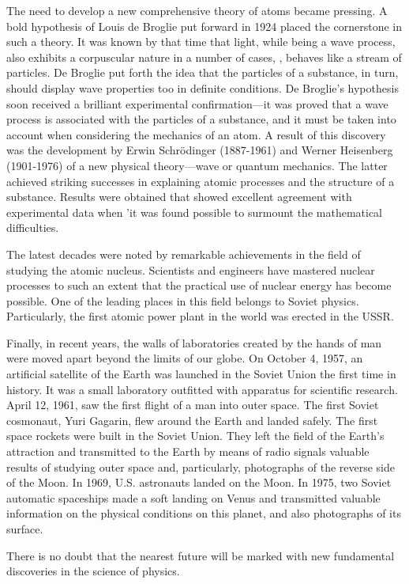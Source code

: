 The need to develop a new comprehensive theory of atoms became pressing. A bold hypothesis of Louis de Broglie put forward in 1924 placed the cornerstone in such a theory. It was known by that time that light, while being a wave process, also exhibits a corpuscular nature in a number of cases, \ie, behaves like a stream of particles. De Broglie put forth the idea that the particles of a substance, in turn, should display wave properties too in definite conditions. De Broglie's hypothesis soon received a brilliant experimental confirmation---it was proved that a wave process is associated with the particles of a substance, and it must be taken into account when considering the mechanics of an atom. A result of this discovery was the development by Erwin Schr\"odinger (1887-1961) and Werner Heisenberg (1901-1976) of a new physical theory---wave or quantum mechanics. The latter achieved striking successes in explaining atomic processes and the structure of a substance. Results were obtained that showed excellent agreement with experimental data when 'it was found possible to surmount the mathematical difficulties.

The latest decades were noted by remarkable achievements in the field of studying the atomic nucleus. Scientists and engineers have mastered nuclear processes to such an extent that the practical use of nuclear energy has become possible. One of the leading places in this field belongs to Soviet physics. Particularly, the first atomic power plant in the world was erected in the USSR.

Finally, in recent years, the walls of laboratories created by the hands of man were moved apart beyond the limits of our globe. On October 4, 1957, an artificial satellite of the Earth was launched in the Soviet Union the first time in history. It was a small laboratory outfitted with apparatus for scientific research. April 12, 1961, saw the first flight of a man into outer space. The first Soviet cosmonaut, Yuri Gagarin, flew around the Earth and landed safely. The first space rockets were built in the Soviet Union. They left the field of the Earth's attraction and transmitted to the Earth by means of radio signals valuable results of studying outer space and, particularly, photographs of the reverse side of the Moon. In 1969, U.S. astronauts landed on the Moon. In 1975, two Soviet automatic spaceships made a soft landing on Venus and transmitted valuable information on the physical conditions on this planet, and also photographs of its surface.

There is no doubt that the nearest future will be marked with new fundamental discoveries in the science of physics.

